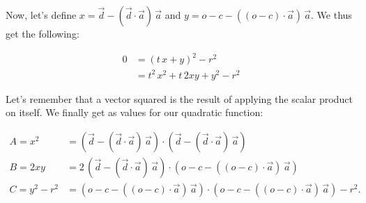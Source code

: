 \documentclass{article}
\begin{document}
    Now, let's define $x = \vec{d} - (\vec{d} \cdot \vec{a}) \, \vec{a}$ and $y = o - c - ((o - c) \cdot \vec{a}) \, \vec{a}$.
    We thus get the following:
    
    \begin{align*}
        0 &= \left(t \, x + y\right)^2 - r^2\\
        &= t^2 \, x^2 + t \, 2xy + y^2 - r^2
    \end{align*}
    
    Let's remember that a vector squared is the result of applying the scalar product on itself.
    We finally get as values for our quadratic function:
    
    \begin{align*}
        A = x^2 &= \left(\vec{d} - (\vec{d} \cdot \vec{a}) \, \vec{a}\right) \cdot \left(\vec{d} - (\vec{d} \cdot \vec{a}) \, \vec{a}\right)\\
        B = 2xy &= 2 \, \left(\vec{d} - (\vec{d} \cdot \vec{a}) \, \vec{a}\right) \cdot \left(o - c - ((o - c) \cdot \vec{a}) \, \vec{a}\right)\\
        C = y^2 - r^2 &= \left(o - c - ((o - c) \cdot \vec{a}) \, \vec{a}\right) \cdot \left(o - c - ((o - c) \cdot \vec{a}) \, \vec{a}\right) - r^2.
    \end{align*}
    
\end{document}
